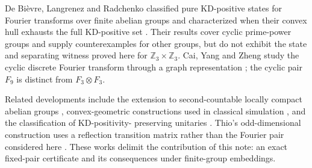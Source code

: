 \documentclass[11pt,a4paper]{article}
\theoremstyle{definition}
\theoremstyle{plain}
\newcommand{\Z}{\mathbb Z}
\begin{document}
De Bi\`evre, Langrenez and Radchenko classified pure KD-positive states for
Fourier transforms over finite abelian groups and characterized when their
convex hull exhausts the full KD-positive set \cite{DLR}. Their results cover
cyclic prime-power groups and supply counterexamples for other groups, but do
not exhibit the state and separating witness proved here for
$\Z_3\times\Z_3$. Cai, Yang and Zheng study the cyclic discrete Fourier
transform through a graph representation \cite{Cai}; the cyclic pair $F_9$
is distinct from $F_3\otimes F_3$.

Related developments include the extension to second-countable locally
compact abelian groups \cite{Spriet}, convex-geometric constructions used in
classical simulation \cite{Thio}, and the classification of KD-positivity-
preserving unitaries \cite{Burkat}. Thio's odd-dimensional construction uses
a reflection transition matrix rather than the Fourier pair considered here
\cite[Theorem 2.2.3]{ThioThesis}. These works delimit the contribution of this
note: an exact fixed-pair certificate and its consequences under finite-group
embeddings.
\end{document}
